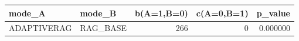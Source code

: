 \begin{tabular}{llrrr}
\toprule
mode_A & mode_B & b(A=1,B=0) & c(A=0,B=1) & p_value \\
\midrule
ADAPTIVERAG & RAG_BASE & 266 & 0 & 0.000000 \\
\bottomrule
\end{tabular}
